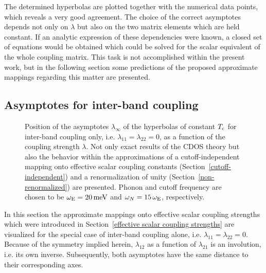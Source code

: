 The determined hyperbolas are plotted together with the numerical data points,
which reveals a very good agreement. The choice of the correct asymptotes
depends not only on $\lambda$ but also on the two matrix elements which are held
constant. If an analytic expression of these dependencies were known, a closed
set of equations would be obtained which could be solved for the scalar
equivalent of the whole coupling matrix. This task is not accomplished within
the present work, but in the following section some predictions of the proposed
approximate mappings regarding this matter are presented.

\subsection{Asymptotes for inter-band coupling}

\begin{figure}
    \small
    
    
    \caption[Asymptotes for inter-band coupling]{
        Position of the asymptotes $\lambda_\infty$ of the hyperbolas of
        constant $T \sb{\text{c}}$ for inter-band coupling only, i.e. $\lambda_{1 1} =
        \lambda_{2 2} = 0$, as a function of the coupling strength $\lambda$.
        Not only exact results of the CDOS  theory but also the
        behavior within the approximations of a cutoff-independent mapping onto
        effective scalar coupling constants (Section~\ref{cutoff-independent})
        and a renormalization of unity (Section~\ref{non-renormalized}) are
        presented. Phonon and cutoff frequency are chosen to be $\omega \sb{\text{E}} =
        20 \, \mathrm{meV}$ and $\omega_N = 15 \, \omega \sb{\text{E}}$, respectively.}
    \label{inter-band hyperbola of constant Tc}
\end{figure}
%
In this section the approximate mappings onto effective scalar coupling
strengths which were introduced in Section~\ref{effective scalar coupling
strengths} are visualized for the special case of inter-band coupling alone,
i.e. $\lambda_{1 1} = \lambda_{2 2} = 0$. Because of the symmetry implied
herein, $\lambda_{1 2}$ as a function of $\lambda_{2 1}$ is an involution, i.e.
its own inverse. Subsequently, both asymptotes have the same distance to their
corresponding axes.

